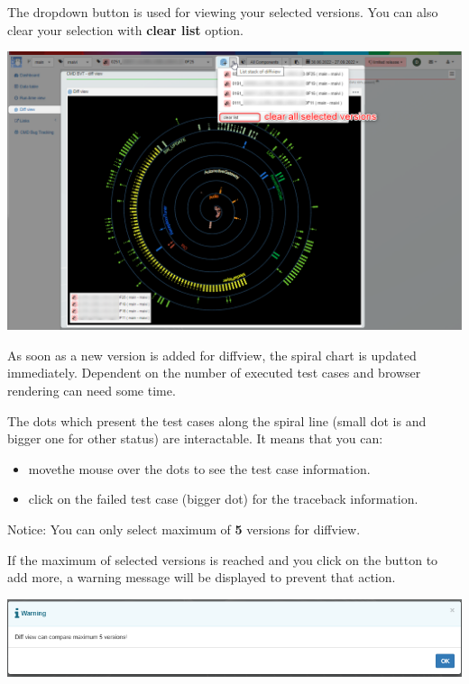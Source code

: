 The dropdown button is used for viewing your selected versions.
You can also clear your selection with \textbf{clear list} option.

\includegraphics[width=1\linewidth]{./pictures/diffview/selected_version.png}

As soon as a new version is added for diffview, the spiral chart is updated 
immediately. Dependent on the number of executed test cases and browser
rendering can need some time.

The dots which present the test cases along the spiral line (small dot is 
 and bigger one for other status) are interactable. 
It means that you can:
\begin{itemize}
   \item movethe mouse over the dots to see the test case information.
   \item click on the failed test case (bigger dot) for the traceback 
         information.
\end{itemize}

\begin{boxhint}{Notice:}
   You can only select maximum of \textbf{5} versions for diffview.

   If the maximum of selected versions is reached and you click on the button to 
   add more, a warning message will be displayed to prevent that action.
\end{boxhint}

\includegraphics[width=\linewidth]{./pictures/diffview/warning.png}

